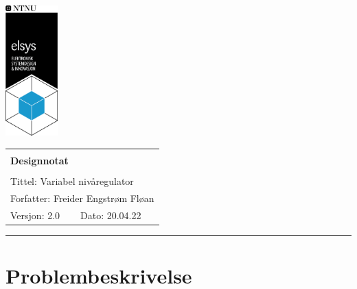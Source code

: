 \documentclass[a4paper,11pt,norsk]{article}
\begin{document}
\begin{minipage}[c]{0.15\textwidth}
\includegraphics[width=2.0cm]{D1/Images/elsys_pos_staaende_ntnu.png}  
\end{minipage}
\begin{minipage}[c]{0.85\textwidth}

\renewcommand{\arraystretch}{1.7}
\large 
\begin{tabularx}{\textwidth}{|X|X|}
\hline
\multicolumn{2}{|l|}{} \\
\multicolumn{2}{|l|}{\huge \textbf{Designnotat}} \\
\multicolumn{2}{|l|}{}  \\
\hline
\multicolumn{2}{|l|}{Tittel: 
Variabel	nivåregulator
} \\
\hline
\multicolumn{2}{|l|}{Forfatter: 
Freider Engstrøm Fløan
} \\
\hline
Versjon: 2.0 & Dato: 20.04.22
\\
\hline 
\end{tabularx}
\end{minipage}
\normalsize


\setlength{\parskip}{0ex}
\renewcommand{\baselinestretch}{0.1}\normalsize
\tableofcontents
\renewcommand{\baselinestretch}{1.00}\normalsize
\setlength{\parskip}{2ex}
\rule{\textwidth}{1pt}
\label{sec:innledning}

\newpage



\section{Problembeskrivelse}
\label{sec:problembeskrivelse}
\end{document}
